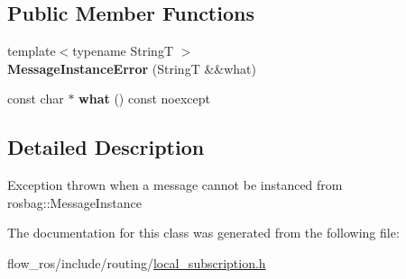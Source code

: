 \subsection*{Public Member Functions}
\begin{DoxyCompactItemize}
\item 
\mbox{\label{classflow__ros_1_1routing_1_1_message_instance_error_a7e9b4e5df423450b855256bfcbea2b6f}} 
{\footnotesize template$<$typename StringT $>$ }\\{\bfseries Message\+Instance\+Error} (StringT \&\&what)
\item 
\mbox{\label{classflow__ros_1_1routing_1_1_message_instance_error_a944235334f1dd42384d724dce8e51430}} 
const char $\ast$ {\bfseries what} () const noexcept
\end{DoxyCompactItemize}


\subsection{Detailed Description}
Exception thrown when a message cannot be instanced from {\ttfamily rosbag\+::\+Message\+Instance} 

The documentation for this class was generated from the following file\+:\begin{DoxyCompactItemize}
\item 
flow\+\_\+ros/include/routing/\hyperlink{local__subscription_8h}{local\+\_\+subscription.\+h}\end{DoxyCompactItemize}
